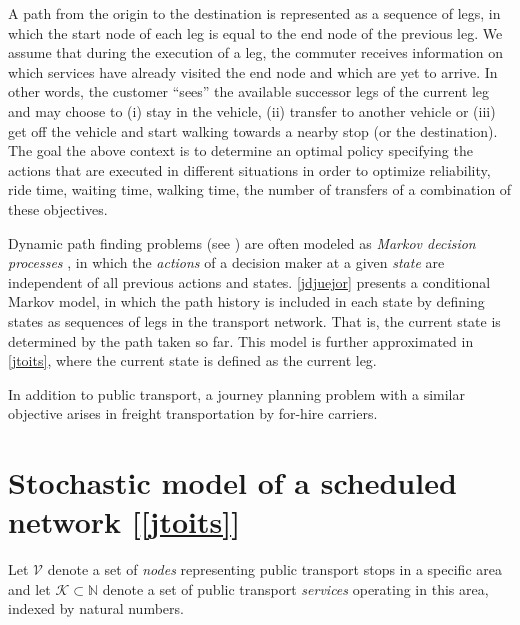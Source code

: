 \documentclass[dissertation,draft*]{aaltoseries}
\begin{document}
A path from the origin to the
destination is represented as a sequence of legs, in which the start node of
each leg is equal to the end node of the previous leg.
We assume that during the execution of a leg, 
the commuter receives information on which
services have already visited the end node %
and which are yet to arrive.
In other words, the customer ``sees'' the available successor legs of the current leg
and may choose to (i) stay in the vehicle, %
(ii) transfer to another vehicle or (iii) get off the vehicle and start
walking towards a nearby stop (or the destination).
The goal the above context is to determine an optimal policy specifying the actions
that are executed in different situations in order to 
optimize reliability, ride time, waiting time, walking time, the number of transfers
of a combination of these objectives.

Dynamic path finding problems (see \cite{hall,bander2002,fu1998,miller-hooks2000,davies,kim2005a,kim2005b,azaron,ferris,thomas,waller}) are often modeled
as \emph{Markov decision processes} \cite{psaraftis93,polychronopoulos}, in which the 
\emph{actions} of a decision maker at a given \emph{state} are independent of all previous actions and states.
\ref{jdjuejor} presents a conditional Markov model, in which the path history is included in each state by
defining states as sequences of legs in the transport network.
That is, the current state is determined by the path taken so far.
This model is further approximated in \ref{jtoits}, where the current state is defined as the current leg.


In addition to public transport, a journey planning problem with a similar objective 
arises in freight transportation by for-hire carriers. 


\section{Stochastic model of a scheduled network [\ref{jtoits}]}
Let $\mathcal{V}$ denote a set of \emph{nodes} representing public transport stops
in a specific area and let $\mathcal{K} \subset \mathbb{N}$ denote a set of public 
transport \emph{services} operating in this area, indexed by natural numbers. 
\end{document}
